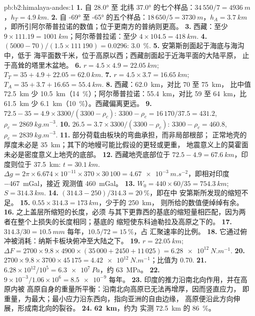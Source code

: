 \begin{solution}{pb:b2:himalaya-andes:1}
\textbf{1.} 自 \ang{28.0} 至 北纬 \ang{37.0} 的七个样品：$34\,550/7 = \qty{4936}{m}$，$h_T
= \qty{4.9}{km}$.
\textbf{2.} 自 \ang{-69} 至 \ang{-65} 的五个样品：$18\,650/5 = \qty{3730}{m}$，$h_A =
\qty{3.7}{km}$，即所引阿尔蒂普拉诺的数值；位于更南方的普纳则更高。
\textbf{3.} 西藏：至少 $9\times111.19 = \qty{1001}{km}$；阿尔蒂普拉诺：至少 $4\times
104.5 = \qty{418}{km}$.
\textbf{4.} $(5000 - 70)/(1.5\times111\,190) = 0.0296$: \qty{3.0}{\percent}.
\textbf{5.} 安第斯剖面起于海底与海沟中，低于
海平面数千米，位于高原以西；西藏剖面起于近海平面的大陆平原，
止于高耸的塔里木盆地。
\textbf{6.} $r = 4.5\times4.9 = \qty{22.05}{km}$; $T_T = 35 + 4.9 + 22.05 = \qty{62.0}{km}$.
\textbf{7.} $r = 4.5\times3.7 = \qty{16.65}{km}$; $T_A = 35 + 3.7 + 16.65 = \qty{55.4}{km}$.
\textbf{8.} 西藏：\qty{62.0}{km}，对比 70 至 \qty{75}{km}，
比中值 \qty{72.5}{km} 少 \qty{10.5}{km}（\qty{14}{\percent}）；阿尔蒂普拉诺：\qty{55.4}{km}，对比 59 至
\qty{64}{km}，比 \qty{61.5}{km} 少 \qty{6.1}{km}（\qty{10}{\percent}）。西藏偏离更远。
\textbf{9.} $72.5 - 35 = 4.9\times3300/(3300 - \rho_c)$: $3300 - \rho_c = 16\,170/37.5 =
431.2$, $\rho_c = \qty{2869}{kg.m^{-3}}$.
\textbf{10.} $26.5 = 3.7\times3300/(3300 - \rho_c)$: $3300 - \rho_c = 460.8$, $\rho_c =
\qty{2839}{kg.m^{-3}}$.
\textbf{11.} 部分荷载由板块的弯曲承担，而非局部根部；
正常地壳的厚度未必是 \qty{35}{km}；其下的地幔可能比假设的更轻或更重，
地震意义上的莫霍面未必是密度意义上地壳的底部。
\textbf{12.} 西藏地壳底部位于 $72.5 - 4.9 = \qty{67.6}{km}$，印度则位于
\qty{37.5}{km}: $t = \qty{30.1}{km}$. $\Delta g = 2\pi\times6.674\times10^{-11}\times370\times
30\,100 = \qty{4.67e-3}{m.s^{-2}}$，即相对印度 \qty{-467}{mGal}，接近
观测值 \qty{460}{mGal}。
\textbf{13.} $W_0 = 440\times60/35 = \qty{754.3}{km}$; $S = \qty{314.3}{km}$.
\textbf{14.} $(314.3 - 250)/314.3 = \qty{20}{\percent}$，即在中
安第斯所发现的缩短不足。
\textbf{15.} $0.55\times314.3 = \qty{173}{km}$，少于的 \qty{250}{km}，
则所给的数值便绰绰有余。
\textbf{16.} 之上盖层所缩短的长度，必须
与其下更靠西的基底的缩短量相匹配，因为两者在整个上损失的长度相同；基底的
缩短使东科迪勒拉及高原之下的。
\textbf{17.} $314.3/30 = \qty{10.5}{mm}$ 每年，$10.5/72 = \qty{15}{\percent}$，占
汇聚速率的比例。
\textbf{18.} 它通过俯冲被消耗：纳斯卡板块俯冲至大陆之下。
\textbf{19.} $r = \qty{22.05}{km}$; $\Delta F = 2700\times9.8\times4900\times(35\,000 + 2450
+ 11\,025) = \qty{6.28e12}{N.m^{-1}}$.
\textbf{20.} $2700\times9.8\times3700\times45\,175 = \qty{4.42e12}{N.m^{-1}}$；比值为
0.70.
\textbf{21.} $6.28\times10^{12}/10^{5} = \qty{6.3e7}{Pa}$，约 \qty{63}{MPa}。
\textbf{22.} $9\times10^{-3}/1.06\times10^{6} = \num{8.5e-9}$ 每年。
\textbf{23.} 印度的推力沿南北向作用，并在高原内被
高原自身的重量所平衡：沿南北向高原已无法再增厚，因而竖直应力，
即重量，为最大；最小应力沿东西向，指向亚洲的自由边缘，
高原便沿此方向伸展，形成南北向的裂谷。
\textbf{24.} \textbf{\qty[text-series-to-math=true]{62}{km}}，约为
实测 \qty{72.5}{km} 的 \qty{86}{\percent}。
\end{solution}
